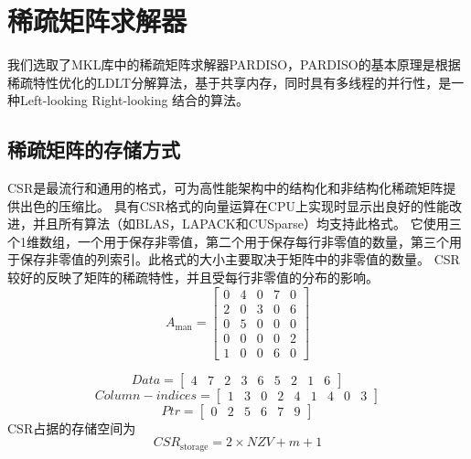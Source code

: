 \documentclass[forprint]{WHUBachelor}
\begin{document}

\section{稀疏矩阵求解器}
我们选取了MKL库中的稀疏矩阵求解器PARDISO，PARDISO的基本原理是根据稀疏特性优化的LDLT分解算法，基于共享内存，同时具有多线程的并行性，是一种Left-looking Right-looking 结合的算法。
\subsection{稀疏矩阵的存储方式}
CSR是最流行和通用的格式，可为高性能架构中的结构化和非结构化稀疏矩阵提供出色的压缩比。 具有CSR格式的向量运算在CPU上实现时显示出良好的性能改进，并且所有算法（如BLAS，LAPACK和CUSparse）均支持此格式。 它使用三个1维数组，一个用于保存非零值，第二个用于保存每行非零值的数量，第三个用于保存非零值的列索引。此格式的大小主要取决于矩阵中的非零值的数量。 CSR较好的反映了矩阵的稀疏特性，并且受每行非零值的分布的影响。
\begin {equation} 
A_{\operatorname{man}}=\left[ \begin{array}{ccccc}{0} & {4} & {0} & {7} & {0} \\ {2} & {0} & {3} & {0} & {6} \\ {0} & {5} & {0} & {0} & {0} \\ {0} & {0} & {0} & {0} & {2} \\ {1} & {0} & {0} & {6} & {0}\end{array}\right]
 \end {equation}

\begin{equation} 
Data=\left[ \begin{array}{ccccccccc}{4} & {7} & {2} & {3} & {6} & {5} & {2} & {1} & {6}\end{array}\right]
 \end{equation}
\begin{equation} 
Column-indices=\left[ \begin{array}{lllllllll}{1} & {3} & {0} & {2} & {4} & {1} & {4} & {0} & {3}\end{array}\right]
 \end{equation}
\begin{equation} 
P t r=\left[ \begin{array}{llllll}{0} & {2} & {5} & {6} & {7} & {9}\end{array}\right]
 \end{equation}
CSR占据的存储空间为
\begin{equation} 
CSR_{\text {storage}}=2 \times N Z V+m+1
 \end{equation}
\end{document}
